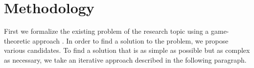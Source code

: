 \documentclass{cacthesis}
\begin{document}
	
	\section{Methodology}
	\label{sec:methodology}
	First we formalize the existing problem of the research topic using a game-theoretic approach \cite{leyton-brown_essentials_2008}. In order to find a solution to the problem, we propose various candidates.  To find a solution that is as simple as possible but as complex as necessary, we take an iterative approach described in the following paragraph.\newline
	
\end{document}
